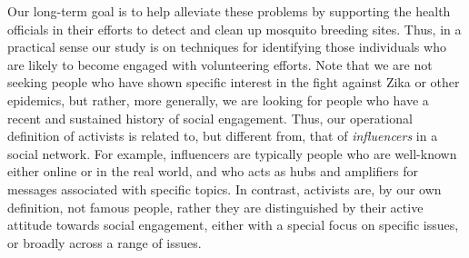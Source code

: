 \documentclass[runningheads]{llncs}
\begin{document}


Our long-term goal is to help alleviate these problems by supporting the health officials in their efforts to detect and clean up mosquito breeding sites.
Thus, in a practical sense our study is on techniques for identifying those individuals who are likely to become engaged with volunteering efforts.
Note that we are not seeking people who have shown  specific interest in the fight against Zika or other epidemics, but rather, more generally, we are looking for people who have a recent and sustained history of social engagement. 
%
Thus, our operational definition of activists is related to, but different from, that of \textit{influencers} in a social network. 
For example, influencers are typically people who are well-known either online or in the real world, and who acts as hubs and amplifiers for messages associated with specific topics. 
In contrast, activists are, by our own definition, not famous people, rather they are distinguished by their active attitude towards social engagement, either with a special focus on specific issues, or broadly across a range of issues.
\end{document}
